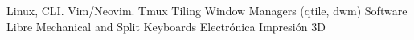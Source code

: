 
\section{}

\cvlistdoubleitem
    {Linux, CLI. Vim/Neovim. Tmux}
    {Tiling Window Managers (qtile, dwm)}
\cvlistdoubleitem
    {             {Software Libre}}
    {Mechanical and Split Keyboards}
\cvlistdoubleitem
    {             {Electrónica}}
    {             {Impresión 3D}}
